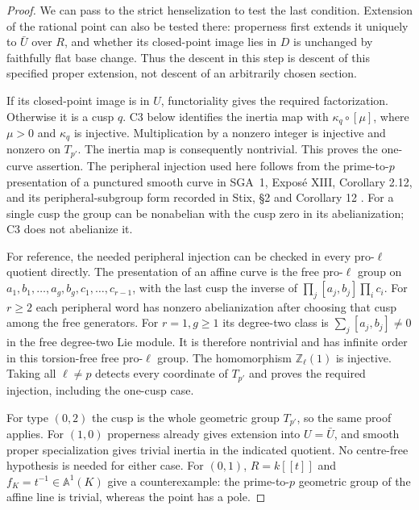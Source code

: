 \begin{proof}
We can pass to the strict henselization to test the last condition. Extension
of the rational point can also be tested there: properness first extends it
uniquely to $\bar U$ over $R$, and whether its closed-point image lies in $D$
is unchanged by faithfully flat base change. Thus the descent in this step
is descent of this specified proper extension, not descent of an arbitrarily
chosen section.

If its closed-point image is in $U$, functoriality gives the required
factorization. Otherwise it is a cusp $q$. C3 below identifies the inertia
map with $\kappa_q\circ[\mu]$, where $\mu>0$ and $\kappa_q$ is injective.
Multiplication by a nonzero integer is injective and nonzero on
$T_{p'}$. The inertia map is consequently nontrivial. This proves the
one-curve assertion. The peripheral injection used here follows from the
prime-to-$p$ presentation of a punctured smooth curve in SGA~1,
Expos\'e XIII, Corollary 2.12, and its peripheral-subgroup form recorded in
Stix, \S2 and Corollary 12 \cite{CF_SGA1,CF_Stix2008}. For a single cusp
the group can be nonabelian with the cusp zero in its abelianization; C3
does not abelianize it.

For reference, the needed peripheral injection can be checked in every
pro-$\ell$ quotient directly. The presentation of an affine curve is the
free pro-$\ell$ group on $a_1,b_1,\ldots,a_g,b_g,c_1,\ldots,c_{r-1}$,
with the last cusp the inverse of
$\prod_j[a_j,b_j]\prod_i c_i$. For $r\geq2$ each peripheral word has
nonzero abelianization after choosing that cusp among the free generators.
For $r=1,g\geq1$ its degree-two class is
$\sum_j[a_j,b_j]\ne0$ in the free degree-two Lie module. It is therefore
nontrivial and has infinite order in this torsion-free free pro-$\ell$
group. The homomorphism $\mathbb Z_\ell(1)$ is injective. Taking all
$\ell\ne p$ detects every coordinate of $T_{p'}$ and proves the required
injection, including the one-cusp case.

For type $(0,2)$ the cusp is the whole geometric group $T_{p'}$, so the
same proof applies. For $(1,0)$ properness already gives extension into
$U=\bar U$, and smooth proper specialization gives trivial inertia in the
indicated quotient. No centre-free hypothesis is needed for either case.
For $(0,1)$, $R=k[[t]]$ and $f_K=t^{-1}\in\mathbb A^1(K)$ give a
counterexample: the prime-to-$p$ geometric group of the affine line is
trivial, whereas the point has a pole.


\end{proof}
